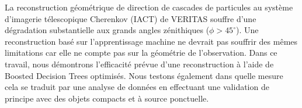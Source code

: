 \documentclass[main.tex]{subfiles}
\begin{document}
La reconstruction g\'eom\'etrique de direction de cascades de particules au système d'imagerie t\'elescopique Cherenkov (IACT) de VERITAS souffre d'une d\'egradation substantielle aux grands angles z\'enithiques ($ \phi> 45 ^{\circ} $). Une reconstruction bas\'e sur l'apprentissage machine ne devrait pas souffrir des m\^emes limitations car elle ne compte pas sur la g\'eom\'etrie de l'observation. Dans ce travail, nous d\'emontrons l'efficacit\'e pr\'evue d'une reconstruction \`a l'aide de Boosted Decision Trees optimis\'es. Nous testons \'egalement dans quelle mesure cela se traduit par une analyse de donn\'ees en effectuant une validation de principe avec des objets compacts et \`a source ponctuelle.
\end{document}
